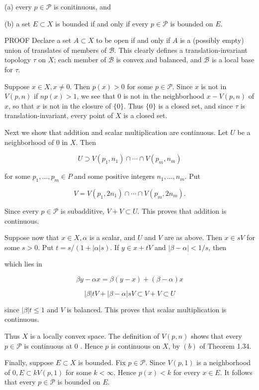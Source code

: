 \documentclass[10pt]{article}
\begin{document}
(a) every $p \in \mathscr{P}$ is conitinuous, and

(b) a set $E \subset X$ is bounded if and only if every $p \in \mathscr{P}$ is bounded on $E$.

PROOF Declare a set $A \subset X$ to be open if and only if $A$ is a (possibly empty) union of translates of members of $\mathscr{B}$. This clearly defines a translation-invariant topology $\tau$ on $X$; each member of $\mathscr{B}$ is convex and balanced, and $\mathscr{B}$ is a local base for $\tau$.

Suppose $x \in X, x \neq 0$. Then $p(x)>0$ for some $p \in \mathscr{P}$. Since $x$ is not in $V(p, n)$ if $n p(x)>1$, we see that 0 is not in the neighborhood $x-V(p, n)$ of $x$, so that $x$ is not in the closure of $\{0\}$. Thus $\{0\}$ is a closed set, and since $\tau$ is translation-invariant, every point of $X$ is a closed set.

Next we show that addition and scalar multiplication are continuous. Let $U$ be a neighborhood of 0 in $X$. Then

$$
U \supset V\left(p_{1}, n_{1}\right) \cap \cdots \cap V\left(p_{m}, n_{m}\right)
$$

for some $p_{1}, \ldots, p_{m} \in P$ and some positive integers $n_{1}, \ldots, n_{m}$. Put

$$
V=V\left(p_{1}, 2 n_{1}\right) \cap \cdots \cap V\left(p_{m}, 2 n_{m}\right) .
$$

Since every $p \in \mathscr{P}$ is subadditive, $V+V \subset U$. This proves that addition is continuous.

Suppose now that $x \in X, \alpha$ is a scalar, and $U$ and $V$ are as above. Then $x \in s V$ for some $s>0$. Put $t=s /(1+|\alpha| s)$. If $y \in x+t V$ and $|\beta-\alpha|<1 / s$, then

which lies in

$$
\beta y-\alpha x=\beta(y-x)+(\beta-\alpha) x
$$

$$
|\beta| t V+|\beta-\alpha| s V \subset V+V \subset U
$$

since $|\beta| t \leq 1$ and $V$ is balanced. This proves that scalar multiplication is continuous.

Thus $X$ is a locally convex space. The definition of $V(p, n)$ shows that every $p \in \mathscr{P}$ is continuous at 0 . Hence $p$ is continuous on $X$, by $(b)$ of Theorem 1.34.

Finally, suppose $E \subset X$ is bounded. Fix $p \in \mathscr{P}$. Since $V(p, 1)$ is a neighborhood of $0, E \subset k V(p, 1)$ for some $k<\infty$. Hence $p(x)<k$ for every $x \in E$. It follows that every $p \in \mathscr{P}$ is bounded on $E$.
\end{document}
